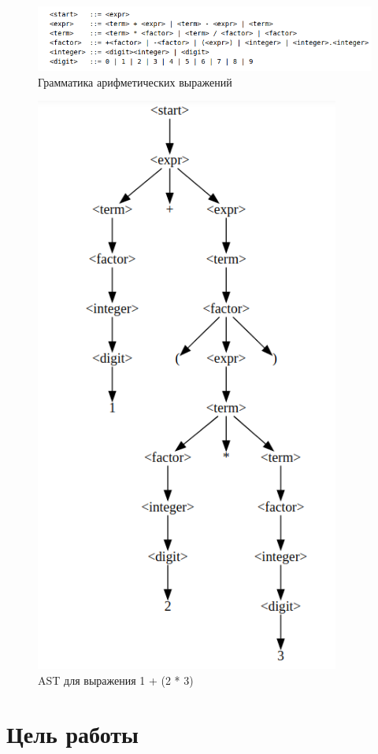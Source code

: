 \documentclass[a4paper]{article}
\begin{document}
\begin{figure}[ht!]
\includegraphics[width=180mm]{Expressions_Grammar.png}
\caption{Грамматика арифметических выражений}
\label{SimpleGrammar}
\end{figure}

\begin{figure}[ht!]
\includegraphics[width=100mm]{SimpleAST.png}
\caption{AST для выражения 1 + (2 * 3)}
\label{SimpleAST}
\end{figure}

\newpage
\section{Цель работы}
\indent
\end{document}

